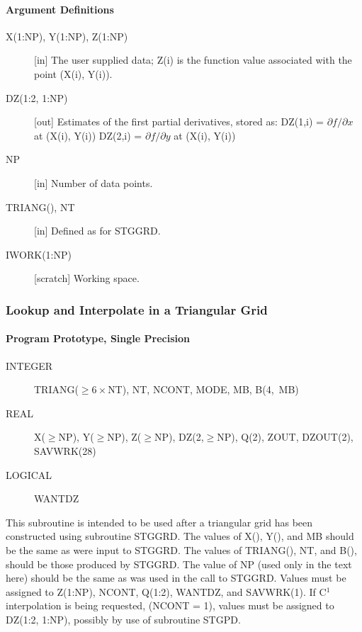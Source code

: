 \documentclass[twoside]{MATH77}
\begin{document}
\paragraph{Argument Definitions}

\begin{description}
\item[X(1:NP), Y(1:NP), Z(1:NP)] [in] The user supplied data; Z(i) is
the function value associated with the point (X(i), Y(i)).
\item[DZ(1:2, 1:NP)] [out] Estimates of the first partial derivatives,
stored as:\newline
\hspace{.25in} DZ(1,i) = $\partial f / \partial x$ at (X(i), Y(i))
\newline
\hspace{.25in} DZ(2,i) = $\partial f / \partial y$ at (X(i), Y(i))
\item[NP] [in] Number of data points.
\item[TRIANG(), NT] [in] Defined as for STGGRD.
\item[IWORK(1:NP)] [scratch] Working space.
\end{description}

\subsubsection{Lookup and Interpolate in a Triangular Grid}

\paragraph{Program Prototype, Single Precision}

\begin{description}
\item[INTEGER]  TRIANG($\geq 6 \times$NT), NT, NCONT,\newline
MODE, MB, B(4,~MB)
\item[REAL] X($\geq$NP), Y($\geq$NP), Z($\geq$NP), DZ(2,$\geq$NP),\newline
Q(2), ZOUT, DZOUT(2), SAVWRK(28)
\item[LOGICAL] WANTDZ
\end{description}

This subroutine is intended to be used after a triangular grid has been
constructed using subroutine STGGRD.  The values of X(), Y(), and MB
should be the same as were input to STGGRD.  The values of TRIANG(), NT,
and B(), should be those produced by STGGRD.  The value of NP (used only
in the text here) should be the same as was used in the call to STGGRD.
Values must be assigned to Z(1:NP), NCONT, Q(1:2), WANTDZ, and SAVWRK(1).
If C$^1$ interpolation is being requested, (NCONT = 1), values must be
assigned to DZ(1:2, 1:NP), possibly by use of subroutine STGPD.
\end{document}
